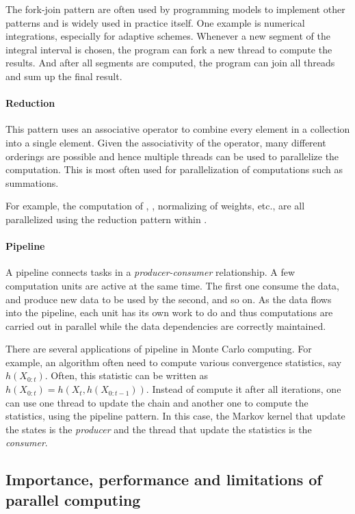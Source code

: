 The fork-join pattern are often used by programming models to implement other
patterns and is widely used in practice itself. One example is numerical
integrations, especially for adaptive schemes. Whenever a new segment of the
integral interval is chosen, the program can fork a new thread to compute the
results. And after all segments are computed, the program can join all threads
and sum up the final result.

\paragraph{Reduction}

This pattern uses an associative operator to combine every element in a
collection into a single element. Given the associativity of the operator,
many different orderings are possible and hence multiple threads can be used
to parallelize the computation. This is most often used for parallelization of
computations such as summations.

For example, the computation of \ess, \cess, normalizing of weights, etc., are
all parallelized using the reduction pattern within \vsmc.

\paragraph{Pipeline}

A pipeline connects tasks in a \emph{producer-consumer} relationship. A few
computation units are active at the same time. The first one consume the data,
and produce new data to be used by the second, and so on. As the data flows
into the pipeline, each unit has its own work to do and thus computations are
carried out in parallel while the data dependencies are correctly maintained.

There are several applications of pipeline in Monte Carlo computing. For
example, an \mcmc algorithm often need to compute various convergence
statistics, say $h(X_{0:t})$. Often, this statistic can be written as
$h(X_{0:t}) = h(X_t, h(X_{0:{t-1}}))$. Instead of compute it after all
iterations, one can use one thread to update the \mcmc chain and another one
to compute the statistics, using the pipeline pattern. In this case, the
Markov kernel that update the states is the \emph{producer} and the thread
that update the statistics is the \emph{consumer}.

\subsection{Importance, performance and limitations of parallel computing}
\label{sub:Importance, performnace and limitations of parallel computing}

